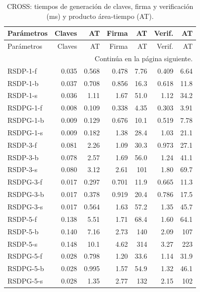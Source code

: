 \endgroup
\begingroup
\small
\setlength{\tabcolsep}{3pt}
\setlength{\LTcapwidth}{\textwidth}
\begin{longtable}{lrrrrrr}
\caption{CROSS: tiempos de generación de claves, firma y verificación (ms) y producto área-tiempo (AT).}\label{tab:eval-cross-tiempos}\\
\toprule
Parámetros & Claves & AT & Firma & AT & Verif. & AT \\
\midrule
\endfirsthead
\toprule
Parámetros & Claves & AT & Firma & AT & Verif. & AT \\
\midrule
\endhead
\midrule
\multicolumn{7}{r}{\small Continúa en la página siguiente.}\\
\endfoot
\bottomrule
\endlastfoot
{RSDP-1-f} & {0.035} & {0.568} & {0.478} & {7.76} & {0.409} & {6.64} \\
{RSDP-1-b} & {0.037} & {0.708} & {0.856} & {16.3} & {0.618} & {11.8} \\
{RSDP-1-s} & {0.036} & {1.11} & {1.67} & {51.0} & {1.12} & {34.2} \\
{RSDPG-1-f} & {0.008} & {0.109} & {0.338} & {4.35} & {0.303} & {3.91} \\
{RSDPG-1-b} & {0.009} & {0.129} & {0.676} & {10.1} & {0.519} & {7.78} \\
{RSDPG-1-s} & {0.009} & {0.182} & {1.38} & {28.4} & {1.03} & {21.1} \\
{RSDP-3-f} & {0.081} & {2.26} & {1.09} & {30.3} & {0.973} & {27.1} \\
{RSDP-3-b} & {0.078} & {2.57} & {1.69} & {56.0} & {1.24} & {41.1} \\
{RSDP-3-s} & {0.080} & {3.12} & {2.61} & {101} & {1.80} & {69.7} \\
{RSDPG-3-f} & {0.017} & {0.297} & {0.701} & {11.9} & {0.665} & {11.3} \\
{RSDPG-3-b} & {0.017} & {0.378} & {0.919} & {20.4} & {0.786} & {17.5} \\
{RSDPG-3-s} & {0.017} & {0.564} & {1.63} & {57.2} & {1.35} & {45.7} \\
{RSDP-5-f} & {0.138} & {5.51} & {1.71} & {68.4} & {1.60} & {64.1} \\
{RSDP-5-b} & {0.140} & {7.16} & {2.73} & {140} & {2.09} & {107} \\
{RSDP-5-s} & {0.148} & {10.1} & {4.62} & {314} & {3.27} & {223} \\
{RSDPG-5-f} & {0.028} & {0.798} & {1.20} & {33.6} & {1.14} & {31.9} \\
{RSDPG-5-b} & {0.028} & {0.995} & {1.57} & {54.9} & {1.32} & {46.1} \\
{RSDPG-5-s} & {0.028} & {1.35} & {2.77} & {132} & {2.15} & {102} \\
\end{longtable}
\endgroup


